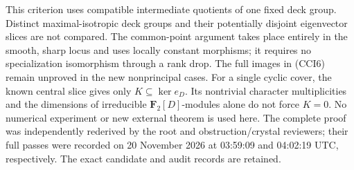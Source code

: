 \begin{remark}
\label{rem:compatible-cyclic-intermediate-scope}
This criterion uses compatible intermediate quotients of one fixed
deck group. Distinct maximal-isotropic deck groups and their
potentially disjoint eigenvector slices are not compared. The
common-point argument takes place entirely in the smooth, sharp
locus and uses locally constant morphisms; it requires no
specialization isomorphism through a rank drop.
The full images in (CCI6) remain unproved in the new nonprincipal
cases. For a single cyclic cover, the known central slice gives
only \(K\subseteq\ker e_D\). Its nontrivial character
multiplicities and the dimensions of irreducible
\(\mathbf F_2[D]\)-modules alone do not force \(K=0\).
No numerical experiment or new external theorem is used here. The complete proof was independently rederived by the root and obstruction/crystal reviewers; their full passes were recorded on 20 November 2026 at 03:59:09 and 04:02:19 UTC, respectively. The exact candidate and audit records are retained.
\end{remark}
